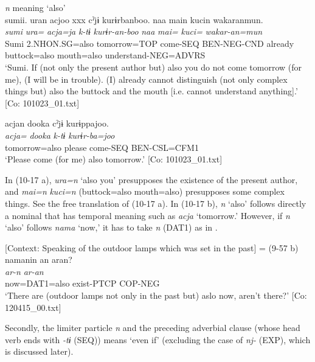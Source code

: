 \ea\label{ex:10.17}   \textit{n} meaning ‘also’\\
  \ea  %
      \glll    sumii.  uran  acjoo  xxx  cˀjɨ  kurɨrbanboo.  naa  main  kucin  wakaranmun.\\
      \textit{sumi}  \textit{ura=}  \textit{acja=ja}    \textit{k-tɨ}  \textit{kurɨr-an-boo}   \textit{naa}  \textit{mai=}  \textit{kuci=}  \textit{wakar-an=mun}\\
      Sumi  2.NHON.SG=also  tomorrow=TOP    come{}-SEQ  BEN-NEG-CND    already  buttock=also  mouth=also  understand-NEG=ADVRS\\
      \glt       ‘Sumi. If (not only the present author but) also you do not come tomorrow (for me), (I will be in trouble). (I) already cannot distinguish (not only complex things but) also the buttock and the mouth [i.e. cannot understand anything].’ [Co: 101023\_01.txt]

  \ex  %
      \glll    acjan  dooka  cˀjɨ  kurɨppajoo.\\
      \textit{acja=}  \textit{dooka}  \textit{k-tɨ}  \textit{kurɨr-ba=joo}\\
      tomorrow=also  please  come-SEQ  BEN-CSL=CFM1\\
      \glt       ‘Please come (for me) also tomorrow.’ [Co: 101023\_01.txt]
    \z
\z

In (10-17 a), \textit{ura=n} ‘also you’ presupposes the existence of the present author, and \textit{mai=n} \textit{kuci=n} (buttock=also mouth=also) presupposes some complex things. See the free translation of (10-17 a). In (10-17 b), \textit{n} ‘also’ follows directly a nominal that has temporal meaning such as \textit{acja} ‘tomorrow.’ However, if \textit{n} ‘also’ follows \textit{nama} ‘now,’ it has to take \textit{n} (DAT1) as in .

\ea\label{ex:10.18}   [Context: Speaking of the outdoor lamps which was set in the past] = (9-57 b)\\
      \glll    namanin  an  aran?\\
    \textit{}  \textit{ar-n}  \textit{ar-an}\\
    now=DAT1=also  exist-PTCP  COP-NEG\\
\glt     ‘There are (outdoor lamps not only in the past but) aslo now, aren’t there?’  [Co: 120415\_00.txt]
\z

  Secondly, the limiter particle \textit{n} and the preceding adverbial clause (whose head verb ends with \textit{{}-tɨ} (SEQ)) means ‘even if’ (excluding the case of \textit{nj-} (EXP), which is discussed later).


